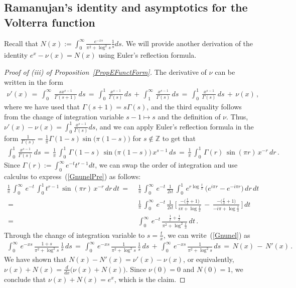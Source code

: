 \documentclass[10pt]{article}
\numberwithin{equation}{section}
\theoremstyle{definition}
\newcommand{\Z}{{\mathbb Z}}
\begin{document}
\begin{appendix}
  \section{Ramanujan's identity and asymptotics for the Volterra function} \label{AppendixSectNu}
 Recall that  $N(x):=\int_0^{\infty}\frac{ e^{-xs}}{\pi^2+\log^2 s }\frac{1}{s}ds $. 
We will provide another  derivation of the identity $e^x-\nu(x)=N(x)$ using Euler's reflection formula.
\begin{proof}[Proof of (iii) of Proposition~\ref{PropEFunctForm}] The derivative of $\nu$ can be written in the form 
\begin{align}\label{ePrime}
    \nu'(x)\,=\,\int_0^{\infty}\, \frac{s x^{s-1}}{\Gamma(s+1) }\,ds\,=\,\int_0^{1} \,\frac{x^{s-1}}{\Gamma(s) }\,ds\,+\,\int_1^{\infty}\, \frac{x^{s-1}}{\Gamma(s) }\,ds \,=\,\int_0^{1} \,\frac{x^{s-1}}{\Gamma(s) }\,ds\,+\,\nu(x)\,, 
\end{align}
where we have used that $\Gamma(s+1)=s\Gamma(s)$, and the third equality follows from the change of integration variable $ s-1\mapsto s$ and the definition of $\nu$.  Thus, $\nu'(x)-\nu(x)= \int_0^{1} \frac{x^{s-1}}{\Gamma(s) }ds $, and we can apply Euler's reflection formula in the form $\frac{1}{\Gamma(s)}=\frac{1}{\pi} \Gamma(1-s) \sin\big(\pi (1-s)\big) $ for $s\notin \Z$ to get that 
\begin{align} \label{GnunelPre}\int_0^1\, \frac{x^{s-1}}{\Gamma(s)}\,ds\,=\,\frac{1}{\pi}\,\int_0^1 \,\Gamma(1-s)\, \sin\big(\pi (1-s)\big) \,  x^{s-1}\,ds\,=\,\frac{1}{\pi}\,\int_0^1\, \Gamma(r) \,\sin(\pi r)\,x^{-r}\,dr \,.   \end{align}
  Since $\Gamma(r):=\int_0^{\infty}e^{-t}t^{r-1}dt  $, we can swap the order of integration and use calculus to express~(\ref{GnunelPre}) as follows:
\begin{align}\label{Gnunel} 
\frac{1}{\pi}\,\int_0^{\infty}\,e^{-t}\,\int_0^{1}t^{r-1}\,  \sin(\pi r)\,x^{-r}\,dr\, dt 
\,=\,&\,\frac{1}{\pi}\,\int_0^{\infty}\,e^{-t}\,\frac{1}{2 it}\,\int_0^{1}\,e^{r\log\frac{t}{x}}\,\big( e^{i\pi r}-e^{-i\pi r} \big)\, dr\, dt \nonumber \\
\,=\,&\,\frac{1}{\pi}\,\int_0^{\infty}\,e^{-t}\,\frac{1}{2it}\,\Bigg[\,\frac{-\big(\frac{t}{x}+1 \big)  }{i\pi+\log \frac{t}{x}  }\,-\,\frac{-\big(\frac{t}{x}+1 \big)  }{-i\pi+\log \frac{t}{x}   }\, \Bigg]\,dt \nonumber \\ \,=\,&\,\int_0^{\infty}\,e^{-t}\,\frac{\frac{1}{t}+\frac{1}{x}  }{\pi^2+\log^2 \frac{t}{x}  }\,dt \,.
\end{align}
Through the change of integration variable to  $s= \frac{t}{x}$, we can write~(\ref{Gnunel}) as
\begin{align*}
 \int_{0}^{\infty}\,e^{-xs}\,\frac{1+s }{\pi^2+\log^2 s   }\,\frac{1}{s}\,ds
 \,=\, \int_{0}^{\infty}\,e^{-x s}\,\frac{1 }{\pi^2+ \log^2 s  }\,\frac{1}{s}\,ds\,+\, \int_{0}^{\infty}\,e^{-xs}\,\frac{1 }{\pi^2+\log^2 s   }\,ds \,=\,N(x)\,-\,N'(x) \,.
\end{align*}
  We have shown that $ N(x)-N'(x)= \nu'(x)  -\nu(x)$, or equivalently,  $\nu(x)+N(x)= \frac{d}{dx}\big( \nu(x)+N(x)\big)$.  Since $\nu(0)=0$ and $N(0)=1$, we conclude that $\nu(x)+N(x) =e^{x}$, which is the claim. \end{proof}



\end{appendix}
\end{document}
